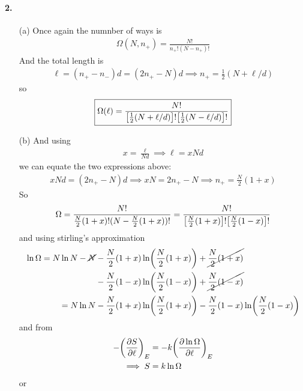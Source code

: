 \documentclass[../main.tex]{subfiles}
\begin{document}
\paragraph{2.}
\begin{itemize}
    \item [(a)]  Once again the numnber of ways is
    \begin{align*}
        \Omega(N, n_+) = \frac{N!}{n_+!(N - n_+)!}
    \end{align*}
    And the total length is
    \begin{align*}
        \ell = (n_+ - n_-) d = (2n_+ - N)d \implies n_+ = \frac{1}{2}(N + \ell/d)
    \end{align*}
    so
    \begin{align*}
        \boxed{
            \Omega(\ell) = \frac{N!}{\qt[\frac{1}{2}(N + \ell/d)]! \qt[\frac{1}{2}(N - \ell/d)]!}
        }
    \end{align*}
    \item [(b)] And using
    \begin{align*}
        x = \frac{\ell}{Nd} \implies \ell = xNd
    \end{align*}
    we can equate the two expressions above:
    \begin{align*}
        xNd = (2n_+ - N)d \implies xN = 2n_+ - N \implies n_+ = \frac{N}{2}(1 + x)
    \end{align*}
    So
    \begin{align*}
        \Omega = \frac{N!}{\frac{N}{2}(1 + x)!(N - \frac{N}{2}(1 + x))!} = \frac{N!}{\qt[\frac{N}{2}(1 + x)]!\qt[\frac{N}{2}(1 - x)]!}
    \end{align*}
    and using stirling's approximation
    \begin{align*}
        \ln \Omega = N \ln N - \cancel{N} &- \frac{N}{2}(1 + x) \ln(\frac{N}{2}(1 + x)) + \cancel{\frac{N}{2}(1 + x)} \\
        &- \frac{N}{2}(1 - x) \ln(\frac{N}{2}(1 - x)) + \cancel{\frac{N}{2}(1 - x)} \\
        = N \ln N &- \frac{N}{2}(1 + x) \ln(\frac{N}{2}(1 + x)) - \frac{N}{2}(1 - x) \ln(\frac{N}{2}(1 - x))
    \end{align*}
    and from
    \begin{align*}
        -\qt(\pdv{S}{\ell})_E &= - k \qt(\pdv{\ln \Omega}{\ell})_E \\
        \implies S &= k \ln \Omega
    \end{align*}
    or
    \begin{align*}
        \boxed{
}
\end{align*}
\end{itemize}
\end{document}
